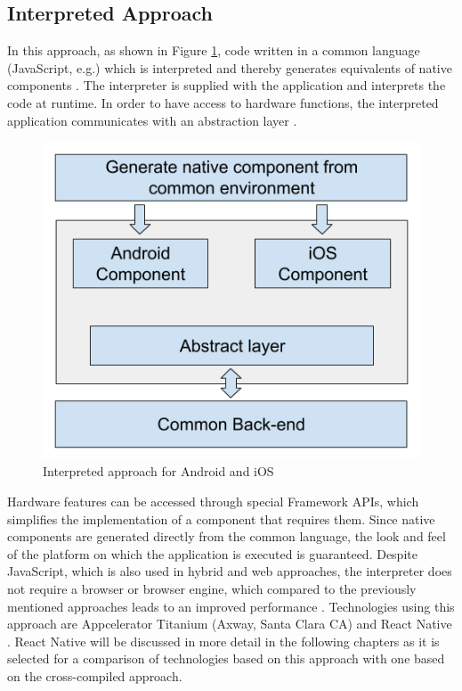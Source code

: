 \documentclass[Bachelor,BIF,english]{twbook}
\begin{document}
\subsection{Interpreted Approach}
In this approach, as shown in Figure \ref{Fig3}, code written in a common language (JavaScript, e.g.) which is interpreted and thereby generates equivalents of native components \cite[p.~3]{7479278}. The interpreter is supplied with the application and interprets the code at runtime. In order to have access to hardware functions, the interpreted application communicates with an abstraction layer \cite[p.~3]{7479278} \cite[p.~2]{7934674}.
\begin{figure}[!htbp]
\centering
\includegraphics[width=0.5\linewidth]{PICs/Interpreted.png}
\caption{Interpreted approach for Android and iOS \cite[p.~3]{7479278}}\label{Fig3}
\end{figure}
Hardware features can be accessed through special Framework APIs, which simplifies the implementation of a component that requires them. Since native components are generated directly from the common language, the look and feel of the platform on which the application is executed is guaranteed. Despite JavaScript, which is also used in hybrid and web approaches, the interpreter does not require a browser or browser engine, which compared to the previously mentioned approaches leads to an improved performance \cite[p.~627]{6420693} \cite[p.~3]{7479278}. Technologies using this approach are Appcelerator Titanium (Axway, Santa Clara CA) and React Native \cite[p.~2]{7934674} \cite[p.~3]{JohanssonSderberg2018}. React Native will be discussed in more detail in the following chapters as it is selected for a comparison of technologies based on this approach with one based on the cross-compiled approach.
\end{document}
